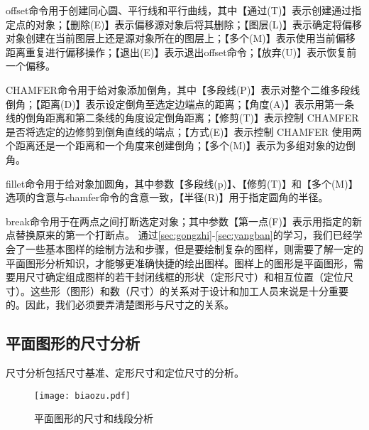 offset命令用于创建同心圆、平行线和平行曲线，其中【通过(T)】表示创建通过指定点的对象；【删除(E)】表示偏移源对象后将其删除；【图层(L)】表示确定将偏移对象创建在当前图层上还是源对象所在的图层上；【多个(M)】表示使用当前偏移距离重复进行偏移操作；【退出(E)】表示退出offset命令；【放弃(U)】表示恢复前一个偏移。

 CHAMFER命令用于给对象添加倒角，其中【多段线(P)】表示对整个二维多段线倒角；【距离(D)】表示设定倒角至选定边端点的距离；【角度(A)】表示用第一条线的倒角距离和第二条线的角度设定倒角距离；【修剪(T)】表示控制 CHAMFER 是否将选定的边修剪到倒角直线的端点；【方式(E)】表示控制 CHAMFER 使用两个距离还是一个距离和一个角度来创建倒角；【多个(M)】表示为多组对象的边倒角。

fillet命令用于给对象加圆角，其中参数【多段线(p)】、【修剪(T)】和【多个(M)】选项的含意与chamfer命令的含意一致，【半径(R)】用于指定圆角的半径。

break命令用于在两点之间打断选定对象；其中参数【第一点(F)】表示用指定的新点替换原来的第一个打断点。
通过\ref{sec:gongzhi}-\ref{sec:yangban}的学习，我们已经学会了一些基本图样的绘制方法和步骤，但是要绘制复杂的图样，则需要了解一定的平面图形分析知识，才能够更准确快捷的绘出图样。图样上的图形是平面图形，需要用尺寸确定组成图样的若干封闭线框的形状（定形尺寸）和相互位置（定位尺寸）。这些形（图形）和数（尺寸）的关系对于设计和加工人员来说是十分重要的。因此，我们必须要弄清楚图形与尺寸之的关系。

\subsection{平面图形的尺寸分析}
尺寸分析包括尺寸基准、定形尺寸和定位尺寸的分析。


\noindent
\begin{figure}[htbp]
\centering
\texttt{[image: biaozu.pdf]}
\caption{平面图形的尺寸和线段分析} \label{fig:biaozu}
\end{figure}
\indent

